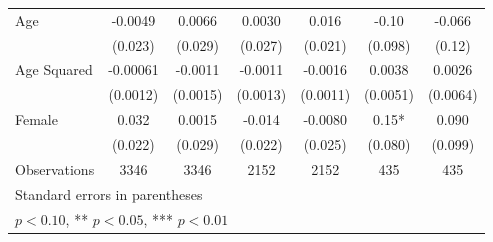 \begin{table}[htbp]
\begin{tabular}{l*{6}{c}}
Age             &  -0.0049   &   0.0066   &   0.0030   &    0.016   &    -0.10   &   -0.066   \\
                &  (0.023)   &  (0.029)   &  (0.027)   &  (0.021)   &  (0.098)   &   (0.12)   \\
Age Squared     & -0.00061   &  -0.0011   &  -0.0011   &  -0.0016   &   0.0038   &   0.0026   \\
                & (0.0012)   & (0.0015)   & (0.0013)   & (0.0011)   & (0.0051)   & (0.0064)   \\
Female          &    0.032   &   0.0015   &   -0.014   &  -0.0080   &     0.15*  &    0.090   \\
                &  (0.022)   &  (0.029)   &  (0.022)   &  (0.025)   &  (0.080)   &  (0.099)   \\
\hline
Observations    &     3346   &     3346   &     2152   &     2152   &      435   &      435   \\
\hline\hline
\multicolumn{7}{l}{\footnotesize Standard errors in parentheses}\\
\multicolumn{7}{l}{\footnotesize * \(p<0.10\), ** \(p<0.05\), *** \(p<0.01\)}\\
\end{tabular}
\end{table}
